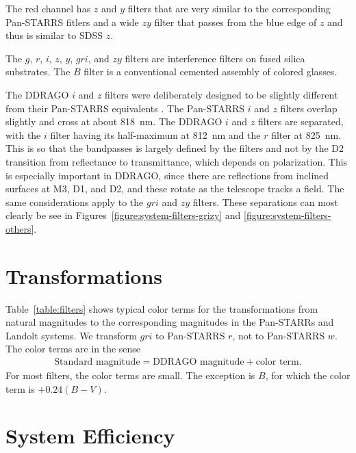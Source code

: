 The red channel has $z$ and $y$ filters that are very similar to the corresponding Pan-STARRS fitlers and a wide $zy$ filter that passes from the blue edge of $z$ and thus is similar to SDSS $z$.

The $g$, $r$, $i$, $z$, $y$, $gri$, and $zy$ filters are interference filters on fused silica substrates. The $B$ filter is a conventional cemented assembly of colored glasses.

The DDRAGO $i$ and $z$ filters were deliberately designed to be slightly different from their Pan-STARRS equivalents \citep{Tonry-2012}. The Pan-STARRS $i$ and $z$ filters overlap slightly and cross at about 818~nm. The DDRAGO $i$ and $z$ filters are separated, with the $i$ filter having its half-maximum at 812~nm and the $r$ filter at 825~nm. This is so that the bandpasses is largely defined by the filters and not by the D2 transition from reflectance to transmittance, which depends on polarization. This is especially important in DDRAGO, since there are reflections from inclined surfaces at M3, D1, and D2, and these rotate as the telescope tracks a field. The same considerations apply to the $gri$ and $zy$ filters. These separations can most clearly be see in Figures~\ref{figure:system-filters-grizy} and \ref{figure:system-filters-others}.


\section{Transformations}

Table~\ref{table:filters} shows typical color terms for the transformations from natural magnitudes to the corresponding magnitudes in the Pan-STARRs and Landolt systems. We transform $gri$ to Pan-STARRS $r$, not to Pan-STARRS $w$. The color terms are in the sense
\begin{align}
\mbox{Standard magnitude} = \mbox{DDRAGO magnitude} + \mbox{color term}.
\end{align}
For most filters, the color terms are small. The exception is $B$, for which the color term is $+0.24(B-V)$.

\section{System Efficiency}

